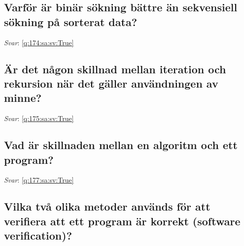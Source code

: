 \documentclass[a4paper,11pt,oneside]{article}
\begin{document}
\begin{sloppypar}
\subsection{Varf\"or \"ar bin\"ar s\"okning b\"attre \"an sekvensiell s\"okning p\r{a} sorterat data?}

\label{q:174:sa:sv:False}

\vspace{2cm}

\noindent\makebox[\textwidth]{\hrulefill}

\vspace{1cm}

\textit{Svar}: \autoref{q:174:sa:sv:True}



\subsection{\"A\ensuremath{\ddot{}}r det n\r{a}gon skillnad mellan iteration och rekursion n\"ar det g\"aller anv\"andningen av minne?}

\label{q:175:sa:sv:False}

\vspace{2cm}

\noindent\makebox[\textwidth]{\hrulefill}

\vspace{1cm}

\textit{Svar}: \autoref{q:175:sa:sv:True}



\subsection{Vad \"ar skillnaden mellan en algoritm och ett program?}

\label{q:177:sa:sv:False}

\vspace{2cm}

\noindent\makebox[\textwidth]{\hrulefill}

\vspace{1cm}

\textit{Svar}: \autoref{q:177:sa:sv:True}



\subsection{Vilka tv\r{a} olika metoder anv\"ands f\"or att verifiera att ett program \"ar korrekt (software verification)?}


\end{sloppypar}
\end{document}
